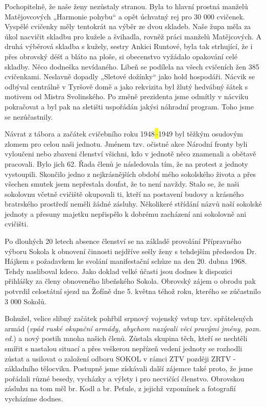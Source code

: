 Pochopitelně, že naše ženy nezůstaly stranou. Byla to hlavní prostná
manželů Matějovcových „Harmonie pohybu`` a opět úchvatný rej pro 30 000
cvičenek. Vyspělé cvičenky měly tentokrát na výběr ze dvou skladeb. Naše
župa měla za úkol nacvičit skladbu pro kužele a švihadla, rovněž práci
manželů Matějcových. A druhá výběrová skladba s kužely, sestry Ankici
Runtové, byla tak strhující, že i přes obrovský déšť a bláto na ploše,
si obecenstvo vyžádalo opakování celé skladby. Něco dodneška nevídaného.
Libeň se podílela na všech cvičeních žen 385 cvičenkami. Neslavně
dopadly „Sletové dožínky`` jako hold hospodáři. Nácvik se odbýval
centrálně v Tyršově domě a jako rekvizita byl žlutý hedvábný šátek s
motivem od Mistra Svolinského. Po změně prezidenta jsme odmítly v
nácviku pokračovat a byl pak na sletišti uspořádán jakýsi náhradní
program. Toho jsme se nezúčastnily.

Návrat z tábora a začátek cvičebního roku 1948\emph{\hl{--}}1949 byl
těžkým osudovým zlomem pro celou naši jednotu. Jménem tzv. očistné akce
Národní fronty byli vyloučeni nebo zbaveni členství všichni, kdo v
jednotě něco znamenali a obětavě pracovali. Bylo jich 62. Řada členů je
následovala tím, že na protest z jednoty vystoupili. Skončilo jedno z
nejkrásnějších období mého sokolského života a přes všechen smutek jsem
nepřestala doufat, že to není navždy. Stalo se, že naši sokolovnu včetně
cvičiště okupovali ti, kteří na postavení budovy a krásného bratrského
prostředí neměli žádné zásluhy. Několikeré střídání názvů naší sokolské
jednoty a přesuny majetku nepřispělo k dobrému zacházení ani sokolovně
ani cvičišti.

Po dlouhých 20 letech absence členství se na základě provolání
Přípravného výboru Sokola k obnovení činnosti nejdříve sešly ženy s
tehdejším předsedou Dr. Hájkem s požadavkem ke svolání manifestační
schůze na den 20. dubna 1968. Tehdy nasliboval kdeco. Jako doklad velké
účasti jsou dodnes k dispozici přihlášky za členy obnoveného libeňského
Sokola. Obrovský zájem o obrodu pak potvrdil celostátní sjezd na Žofíně
dne 5. května téhož roku, kterého se zúčastnilo 3 000 Sokolů.

Bohužel, velice slibný začátek pohřbil srpnový vojenský vstup tzv.
spřátelených armád (\emph{vpád ruské okupační armády, abychom nazývali
věci pravými jmény, pozn. ed.}) a nový postih mnoha našich členů.
Zůstala skupina těch, kteří se nechtěli smířit s nastalou situací a přes
veškerou nepřízeň vedení jednoty se rozhodli zůstat a usilovat o
založení odboru SOKOL v rámci ZTV později ZRTV - základního tělocviku.
Postupně jsme získávali další zájemce také proto, že jsme pořádali různé
besedy, vycházky a výlety i pro necvičící členstvo. Obrovskou zásluhu na
tom měl br. Kodl a br. Peťule, z jejichž vzpomínek a fotografií
vycházíme dodnes.

